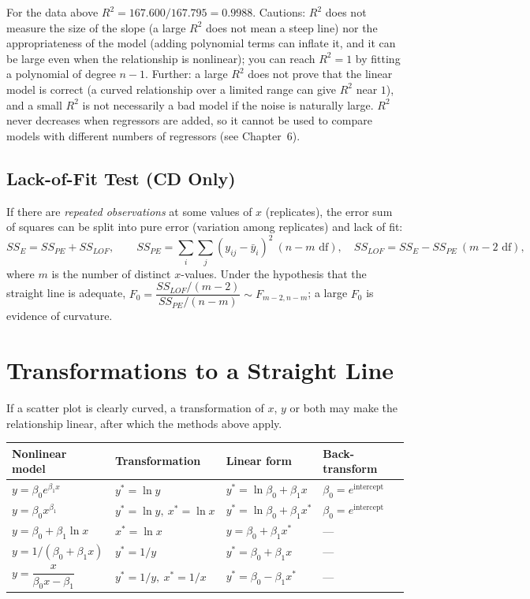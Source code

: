 For the data above $R^2=167.600/167.795=0.9988$. Cautions: $R^2$ does not measure the size of the slope (a large $R^2$ does not mean a steep line) nor the appropriateness of the model (adding polynomial terms can inflate it, and it can be large even when the relationship is nonlinear); you can reach $R^2=1$ by fitting a polynomial of degree $n-1$. Further: a large $R^2$ does not prove that the linear model is correct (a curved relationship over a limited range can give $R^2$ near $1$), and a small $R^2$ is not necessarily a bad model if the noise is naturally large. $R^2$ never decreases when regressors are added, so it cannot be used to compare models with different numbers of regressors (see Chapter~6).

\subsection{Lack-of-Fit Test (CD Only)}

If there are \emph{repeated observations} at some values of $x$ (replicates), the error sum of squares can be split into pure error (variation among replicates) and lack of fit:
\[ SS_E=SS_{PE}+SS_{LOF},\qquad SS_{PE}=\sum_i\sum_j(y_{ij}-\bar{y}_i)^2\ (n-m\text{ df}),\quad SS_{LOF}=SS_E-SS_{PE}\ (m-2\text{ df}), \]
where $m$ is the number of distinct $x$-values. Under the hypothesis that the straight line is adequate, $F_0=\dfrac{SS_{LOF}/(m-2)}{SS_{PE}/(n-m)}\sim F_{m-2,n-m}$; a large $F_0$ is evidence of curvature.

\section{Transformations to a Straight Line}

If a scatter plot is clearly curved, a transformation of $x$, $y$ or both may make the relationship linear, after which the methods above apply.

\begin{center}
\begin{tabular}{llll}
\toprule
Nonlinear model & Transformation & Linear form & Back-transform \\
\midrule
$y=\beta_0e^{\beta_1x}$ & $y^*=\ln y$ & $y^*=\ln\beta_0+\beta_1x$ & $\beta_0=e^{\text{intercept}}$ \\
$y=\beta_0x^{\beta_1}$ & $y^*=\ln y,\ x^*=\ln x$ & $y^*=\ln\beta_0+\beta_1x^*$ & $\beta_0=e^{\text{intercept}}$ \\
$y=\beta_0+\beta_1\ln x$ & $x^*=\ln x$ & $y=\beta_0+\beta_1x^*$ & --- \\
$y=1/(\beta_0+\beta_1x)$ & $y^*=1/y$ & $y^*=\beta_0+\beta_1x$ & --- \\
$y=\dfrac x{\beta_0x-\beta_1}$ & $y^*=1/y,\ x^*=1/x$ & $y^*=\beta_0-\beta_1x^*$ & --- \\
\bottomrule
\end{tabular}
\end{center}

